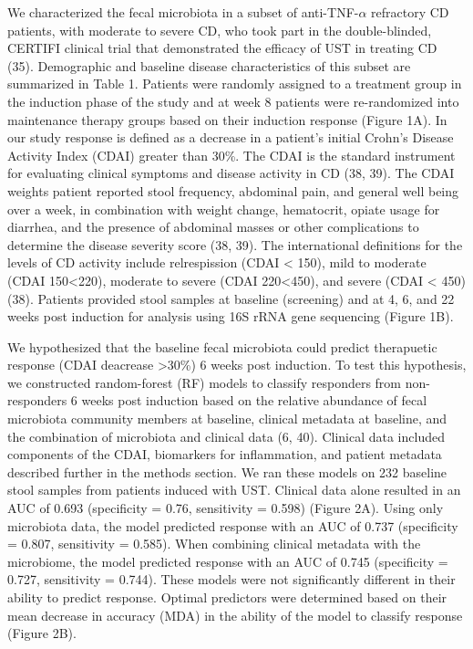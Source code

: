 \documentclass[11pt,]{article}
\begin{document}
We characterized the fecal microbiota in a subset of
anti-TNF-\({\alpha}\) refractory CD patients, with moderate to severe
CD, who took part in the double-blinded, CERTIFI clinical trial that
demonstrated the efficacy of UST in treating CD (35). Demographic and
baseline disease characteristics of this subset are summarized in Table
1. Patients were randomly assigned to a treatment group in the induction
phase of the study and at week 8 patients were re-randomized into
maintenance therapy groups based on their induction response (Figure
1A). In our study response is defined as a decrease in a patient's
initial Crohn's Disease Activity Index (CDAI) greater than 30\%. The
CDAI is the standard instrument for evaluating clinical symptoms and
disease activity in CD (38, 39). The CDAI weights patient reported stool
frequency, abdominal pain, and general well being over a week, in
combination with weight change, hematocrit, opiate usage for diarrhea,
and the presence of abdominal masses or other complications to determine
the disease severity score (38, 39). The international definitions for
the levels of CD activity include relrespission (CDAI \textless{} 150),
mild to moderate (CDAI 150\textless{}220), moderate to severe (CDAI
220\textless{}450), and severe (CDAI \textless{} 450) (38). Patients
provided stool samples at baseline (screening) and at 4, 6, and 22 weeks
post induction for analysis using 16S rRNA gene sequencing (Figure 1B).

We hypothesized that the baseline fecal microbiota could predict
therapuetic response (CDAI deacrease \textgreater{}30\%) 6 weeks post
induction. To test this hypothesis, we constructed random-forest (RF)
models to classify responders from non-responders 6 weeks post induction
based on the relative abundance of fecal microbiota community members at
baseline, clinical metadata at baseline, and the combination of
microbiota and clinical data (6, 40). Clinical data included components
of the CDAI, biomarkers for inflammation, and patient metadata described
further in the methods section. We ran these models on 232 baseline
stool samples from patients induced with UST. Clinical data alone
resulted in an AUC of 0.693 (specificity = 0.76, sensitivity = 0.598)
(Figure 2A). Using only microbiota data, the model predicted response
with an AUC of 0.737 (specificity = 0.807, sensitivity = 0.585). When
combining clinical metadata with the microbiome, the model predicted
response with an AUC of 0.745 (specificity = 0.727, sensitivity =
0.744). These models were not significantly different in their ability
to predict response. Optimal predictors were determined based on their
mean decrease in accuracy (MDA) in the ability of the model to classify
response (Figure 2B).
\end{document}
